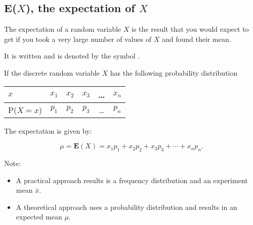 \newpage	

\subsection{E($X$), the expectation of $X$}	

The expectation of a random variable $X$ is the result that you would expect to get if you took a very large number of values of $X$ and found their mean.

\medskip
 
It is written \underline{\hspace{2cm}} and is denoted by the symbol \underline{\hspace{2cm}}.

\medskip

If the discrete random variable $X$ has the following probability distribution

\begin{table}[!htpb]

	\begin{tabular}{|l|c|c|c|c|c|}
		\hline
		$x $     & $x_1$ & $x_2$ & $x_3$ & \ldots & $x_n$ \\ \hline
		P($X=x$) & $p_1$ & $p_2$ & $p_3$ & \ldots & $p_n$ \\ \hline
	\end{tabular}
\end{table}

The expectation is given by:

\[
\mu = \textbf{E}(X)= x_1p_1+x_2p_2+x_3p_3+\cdots + x_np_n.
\]


Note: 



\begin{itemize}
	
	\setlength\itemsep{0.5em}
	\item A practical approach results is a frequency distribution and an experiment mean $\bar{x}$.
	
	\item A theoretical approach uses a probability distribution and results in an expected mean $\mu$.
\end{itemize}


